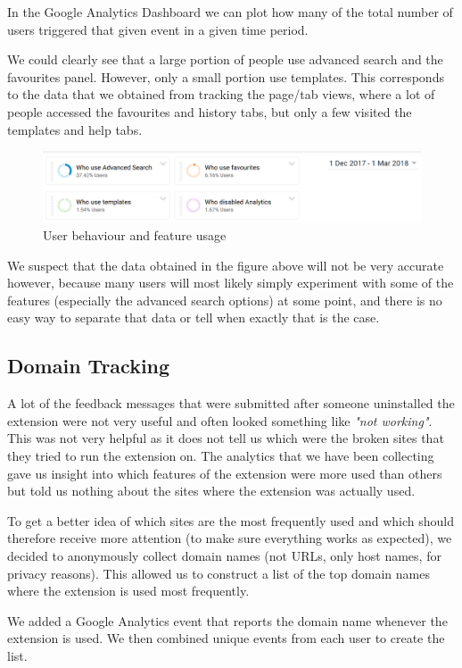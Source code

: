 \documentclass[bsc,frontabs,twoside,singlespacing,parskip,deptreport]{infthesis}
\begin{document}
In the Google Analytics Dashboard we can plot how many of the total number of users triggered that given event in a given time period.

We could clearly see that a large portion of people use advanced search and the favourites panel. However, only a small portion use templates. This corresponds to the data that we obtained from tracking the page/tab views, where a lot of people accessed the favourites and history tabs, but only a few visited the templates and help tabs.

\begin{figure}[h]
\centering
\includegraphics[width=1\textwidth]{../docs/user-feature-usage.png}
\caption{User behaviour and feature usage}
\end{figure}

We suspect that the data obtained in the figure above will not be very accurate however, because many users will most likely simply experiment with some of the features (especially the advanced search options) at some point, and there is no easy way to separate that data or tell when exactly that is the case.


\subsection{Domain Tracking}
A lot of the feedback messages that were submitted after someone uninstalled the extension were not very useful and often looked something like \textit{"not working"}. This was not very helpful as it does not tell us which were the broken sites that they tried to run the extension on. The analytics that we have been collecting gave us insight into which features of the extension were more used than others but told us nothing about the sites where the extension was actually used.

To get a better idea of which sites are the most frequently used and which should therefore receive more attention (to make sure everything works as expected), we decided to anonymously collect domain names (not URLs, only host names, for privacy reasons). This allowed us to construct a list of the top domain names where the extension is used most frequently.

We added a Google Analytics event that reports the domain name whenever the extension is used. We then combined unique events from each user to create the list.
\end{document}
